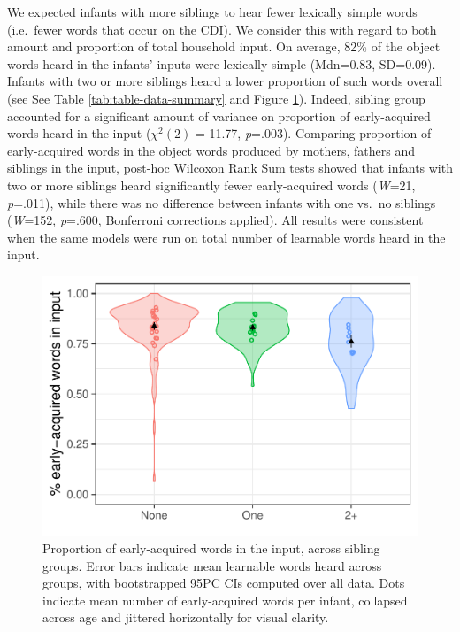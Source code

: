 \documentclass[man,floatsintext]{apa6}
\begin{document}
We expected infants with more siblings to hear fewer lexically simple words (i.e.~fewer words that occur on the CDI). We consider this with regard to both amount and proportion of total household input. On average, 82\% of the object words heard in the infants' inputs were lexically simple (Mdn=0.83, SD=0.09). Infants with two or more siblings heard a lower proportion of such words overall (see See Table \ref{tab:table-data-summary} and Figure \ref{fig:Figure-in-cdi}). Indeed, sibling group accounted for a significant amount of variance on proportion of early-acquired words heard in the input (\(\chi^2 (2)\) = 11.77, \emph{p}=.003). Comparing proportion of early-acquired words in the object words produced by mothers, fathers and siblings in the input, post-hoc Wilcoxon Rank Sum tests showed that infants with two or more siblings heard significantly fewer early-acquired words (\emph{W}=21, \emph{p}=.011), while there was no difference between infants with one vs.~no siblings (\emph{W}=152, \emph{p}=.600, Bonferroni corrections applied). All results were consistent when the same models were run on total number of learnable words heard in the input.

\begin{figure}
\centering
\includegraphics{SiblingsStudyText_files/figure-latex/Figure-in-cdi-1.pdf}
\caption{\label{fig:Figure-in-cdi}Proportion of early-acquired words in the input, across sibling groups. Error bars indicate mean learnable words heard across groups, with bootstrapped 95PC CIs computed over all data. Dots indicate mean number of early-acquired words per infant, collapsed across age and jittered horizontally for visual clarity.}
\end{figure}
\end{document}
